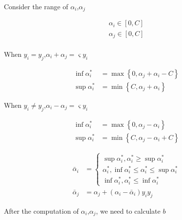 \documentclass[a4paper,12pt]{article}
\begin{document}
        Consider the range of $\alpha_i$,$\alpha_j$

        \begin{equation}
            \begin{split}
                \alpha_i\in[0,C]\\
                \alpha_j\in[0,C]\\
            \end{split}
        \end{equation}

        When $y_i=y_j$,$\alpha_i+\alpha_j=\varsigma y_i$

        \begin{equation}
            \begin{split}
                \inf{\alpha_i^*}&=\max\left\{0,\alpha_j+\alpha_i-C\right\}\\
                \sup{\alpha_i^*}&=\min\left\{C,\alpha_j+\alpha_i\right\}
            \end{split}
        \end{equation}

        When $y_i\neq y_j$,$\alpha_i-\alpha_j=\varsigma y_i$

        \begin{equation}
            \begin{split}
                \inf{\alpha_i^*}&=\max\left\{0,\alpha_j-\alpha_i\right\}\\
                \sup{\alpha_i^*}&=\min\left\{C,\alpha_j-\alpha_i+C\right\}
            \end{split}
        \end{equation}

        \begin{equation}
            \begin{split}
                \bar{\alpha}_i&=\begin{cases}
                    \sup{\alpha_i^*},\alpha_i^*\geq\sup{\alpha_i^*}\\
                    \alpha_i^*,\inf{\alpha_i^*}\leq\alpha_i^*\leq\sup{\alpha_i^*}\\
                    \inf{\alpha_i^*},\alpha_i^*\leq\inf{\alpha_i^*}
                \end{cases}\\
                \bar{\alpha}_j&=\alpha_j+(\alpha_i-\bar{\alpha}_i) y_iy_j
            \end{split}
        \end{equation}

        After the computation of $\alpha_i$,$\alpha_j$, we need to calculate $b$
\end{document}
